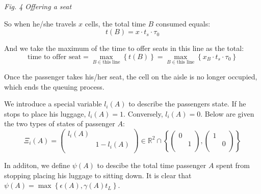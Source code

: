 \documentclass{article}
\theoremstyle{definition}
\theoremstyle{remark}
\numberwithin{equation}{section}
\begin{document}
\begin{itemize}
\begin{center}
		\small\textit{Fig. 4 Offering a seat}
		\end{center}

		So when he/she travels $x$ cells, the total time \(B\) consumed equals:
		$$t(B)=x\cdot t_s \cdot \tau_0$$

		And we take the maximum of the time to offer seats in this line as the total:
		\[\text{time to offer seat}=\max\limits_{B\in \text{this line}}\left\{t(B)\right\} = \max\limits_{B\in \text{this line}}\left\{x_{B}\cdot t_s \cdot \tau_0\right\}\]

		Once the passenger takes his/her seat, the cell on the aisle is no longer occupied, which ends the queuing process.
	\end{itemize}
	We introduce a special variable $l_i(A)$ to describe the passengers state. If he stops to place his luggage, \(l_i(A)=1\). Conversely, \(l_i(A)=0\). Below are given the two types of states of passenger \(A\):
	\[\Xi_i\left(A\right)=\left( \begin{matrix}
	l_i\left( A \right)&		\\
	&		1-l_i\left( A \right)\\
	\end{matrix} \right) \in \mathbb{R}^2\cap \left\{ \left( \begin{matrix}
	0&		\\
	&		1\\
	\end{matrix} \right) ,\left( \begin{matrix}
	1&		\\
	&		0\\
	\end{matrix} \right) \right\}\]

	In additon, we define $\psi(A)$ to descibe the total time passenger $A$ spent from stopping placing his luggage to sitting down. It is clear that $\psi \left( A \right) =\max \left\{ \epsilon \left( A \right) ,\gamma \left( A \right) t_L \right\}$.
\end{document}
